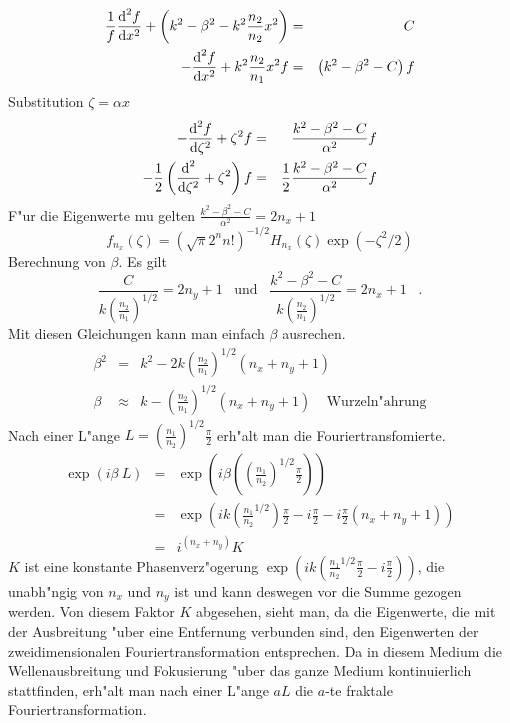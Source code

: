 \documentclass[11pt,twoside]{report}
\begin{document}
\begin{eqnarray*}
  \frac{1}{f} {\mbox{d}^2 f \over \mbox{d} x^2} + \left( k^2 - \beta^2 - k^2 \frac{n_2}{n_2} x^2 \right) & = & C \\
  -{\mbox{d}^2 f\over \mbox{d} x^2} + k^2 \frac{n_2}{n_1} x^2 f & = & \left( k^2-\beta^2 - C\right) f \\
\end{eqnarray*}
Substitution $\zeta = \alpha x$
\begin{eqnarray*}
  -{\mbox{d}^2 f \over \mbox{d} \zeta^2} + \zeta^2 f & = & \frac{k^2 - \beta^2 - C}{\alpha^2} f\\
  -\frac{1}{2}\left( {\mbox{d} ^2 \over \mbox{d} \zeta^2 } + \zeta^2 \right) f & = & \frac{1}{2}\frac{k^2 - \beta^2 - C}{\alpha^2}f \\
\end{eqnarray*}
F"ur die Eigenwerte mu\3 gelten $\frac{k^2 - \beta^2 - C}{\alpha^2} = 2n_x + 1$
$$ f_{n_x} \left( \zeta \right) = \left( \sqrt{\pi} 2^n n! \right)^{-1/2} H_{n_x} \left( \zeta \right) \exp\left( -\zeta^2 / 2\right) $$ 
Berechnung von $\beta$. Es gilt 
$$ \frac{C}{k\left( \frac{n_2}{n_1}\right)^{1/2}} = 2n_y + 1 \;\;\; \mbox{und} \;\;\;  \frac{k^2-\beta^2 -C}{k\left( \frac{n_2}{n_1}\right)^{1/2}} = 2n_x + 1 \;\;\;.$$
Mit diesen Gleichungen kann man einfach $\beta$ ausrechen. 
\begin{eqnarray*}
  \beta^2 & = & k^2-2k\left( \frac{n_2}{n_1} \right)^{1/2} \left( n_x + n_y + 1\right) \\
  \beta   & \approx & k-\left( \frac{n_2}{n_1} \right)^{1/2} \left( n_x + n_y + 1\right) \;\;\;\; \mbox{Wurzeln"ahrung}
\end{eqnarray*}
Nach einer L"ange $L=\left( \frac{n_1}{n_2} \right)^{1/2} \frac{\pi}{2}$ erh"alt man die Fouriertransfomierte.
\begin{eqnarray*}
  \exp\left( i\beta\ L\right) & = & \exp\left( i\beta\left( \left( \frac{n_1}{n_2} \right)^{1/2} \frac{\pi}{2} \right)\right) \\ & = &
  \exp\left( ik\left( \frac{n_1}{n_2}^{1/2}\right)\frac{\pi}{2} - i\frac{\pi}{2} - i\frac{\pi}{2} \left( n_x + n_y + 1 \right) \right) \\ & = &
  i^{\left( n_x + n_y \right)} K
\end{eqnarray*}
$K$ ist eine konstante Phasenverz"ogerung $\exp\left( ik\left( \frac{n_1}{n_2}^{1/2} \frac{\pi}{2} - i \frac{\pi}{2}\right) \right)$, die unabh"ngig von $n_x$ und $n_y$ ist und kann deswegen vor die Summe gezogen werden. Von diesem Faktor $K$ abgesehen, sieht man, da\3 die Eigenwerte, die mit der Ausbreitung "uber eine Entfernung verbunden sind, den Eigenwerten der zweidimensionalen Fouriertransformation entsprechen. Da in diesem Medium die Wellenausbreitung und Fokusierung "uber das ganze Medium kontinuierlich stattfinden, erh"alt man nach einer L"ange $aL$ die $a$-te fraktale Fouriertransformation.
\end{document}
